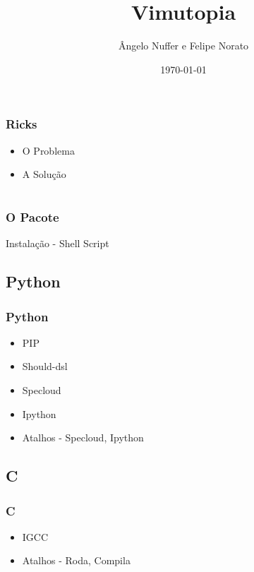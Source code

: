 \documentclass[]{beamer}
\title{Vimutopia}
\author{Ângelo Nuffer e Felipe Norato}
\institute{NSI-IFF}
\date{\today}
\begin{document}
\begin{frame}
    \titlepage
\end{frame}

\section[Ricks]{}
\begin{frame}
    \frametitle{Ricks}
    \begin{itemize}
        \item<1-> O Problema
        \item<2-> A Solução
    \end{itemize}
\end{frame}

\section[Rocks]{}
\begin{frame}
    \frametitle{O Pacote}
        Instalação - Shell Script
\end{frame}

\subsection{Python}

\begin{frame}
    \frametitle{Python}
    \begin{itemize}
        \item<1-> PIP
        \item<2-> Should-dsl
        \item<3-> Specloud
        \item<4-> Ipython
        \item<5-> Atalhos - Specloud, Ipython
    \end{itemize}
\end{frame}

\subsection{C}

\begin{frame}
    \frametitle{C}
    \begin{itemize}
        \item<1-> IGCC
        \item<2-> Atalhos - Roda, Compila
    \end{itemize}
\end{frame}
\end{document}
